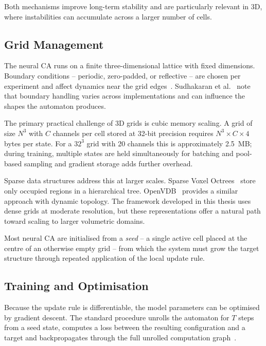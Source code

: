Both mechanisms improve long-term stability and are particularly relevant in 3D,
where instabilities can accumulate across a larger number of cells.

\subsection{Grid Management}

The neural CA runs on a finite three-dimensional lattice with fixed dimensions.
Boundary conditions -- periodic, zero-padded, or reflective -- are chosen per
experiment and affect dynamics near the grid edges~\cite{Mordvintsev2020}.
Sudhakaran et al.~\cite{Sudhakaran2021} note that boundary handling varies across
implementations and can influence the shapes the automaton produces.

The primary practical challenge of 3D grids is cubic memory scaling. A grid of size
$N^3$ with $C$ channels per cell stored at 32-bit precision requires
$N^3 \times C \times 4$ bytes per state. For a $32^3$ grid with 20 channels this is
approximately 2.5~MB; during training, multiple states are held simultaneously for
batching and pool-based sampling and gradient storage adds further overhead.

Sparse data structures address this at larger scales. Sparse Voxel
Octrees~\cite{Laine2010} store only occupied regions in a hierarchical tree.
OpenVDB~\cite{Museth2013} provides a similar approach with dynamic topology. The
framework developed in this thesis uses dense grids at moderate resolution, but
these representations offer a natural path toward scaling to larger volumetric
domains.

Most neural CA are initialised from a \emph{seed} -- a single active cell placed at
the centre of an otherwise empty grid -- from which the system must grow the target
structure through repeated application of the local update rule.

\clearpage

\subsection{Training and Optimisation}

Because the update rule is differentiable, the model parameters can be optimised by
gradient descent. The standard procedure unrolls the automaton for $T$ steps from a
seed state, computes a loss between the resulting configuration and a target and
backpropagates through the full unrolled computation graph~\cite{Mordvintsev2020}.

